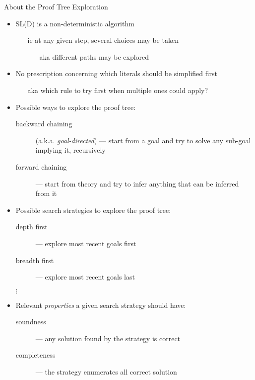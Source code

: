 \documentclass[presentation]{beamer}\mode<presentation>{\usetheme{AMSBolognaFC}}
\begin{document}
\begin{frame}[allowframebreaks]{About the Proof Tree Exploration}
    \begin{itemize}
        \item SL(D) is a \alert{non-deterministic} algorithm
        \begin{itemize}
            \item[ie] at any given step, several choices may be taken
            \begin{itemize}
                \item[aka] different paths may be explored
            \end{itemize}
        \end{itemize}

        \bigskip

        \item No prescription concerning which literals should be simplified first
        \begin{itemize}
            \item[aka] which rule to try first when multiple ones could apply?
        \end{itemize}

        \bigskip

        \item Possible ways to explore the proof tree:
        \begin{description}
            \item[backward chaining] (a.k.a. \emph{goal-directed}) --- start from a goal and try to solve any sub-goal implying it, recursively
            \item[forward chaining] --- start from theory and try to infer anything that can be inferred from it
        \end{description}

        \framebreak

        \item Possible search strategies to explore the proof tree:
        \begin{description}
            \item[depth first] --- explore most recent goals \alert{first}
            \item[breadth first] --- explore most recent goals \alert{last}
            \item[$\vdots$]
        \end{description}

        \bigskip

        \item Relevant \emph{properties} a given search strategy should have:
        \begin{description}
            \item[soundness] --- \alert{any} solution found by the strategy is \alert{correct}
            \item[completeness] --- the strategy enumerates \alert{all} correct solution
        \end{description}
    \end{itemize}
\end{frame}
\end{document}
